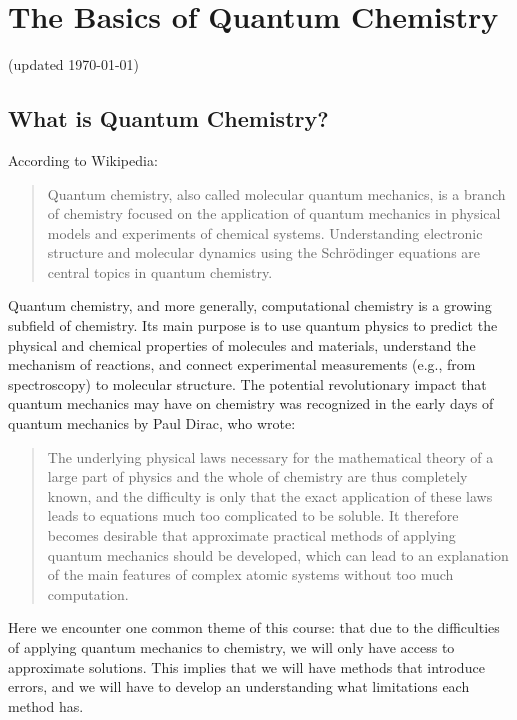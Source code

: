 \documentclass[../Main/chem371-notes.tex]{subfiles}
\begin{document}
\chapter{The Basics of Quantum Chemistry}

(updated \today)

\section{What is Quantum Chemistry?}
According to Wikipedia:
\begin{quotation}
Quantum chemistry, also called molecular quantum mechanics, is a branch of chemistry focused on the application of quantum mechanics in physical models and experiments of chemical systems. Understanding electronic structure and molecular dynamics using the Schrödinger equations are central topics in quantum chemistry.
\end{quotation}

Quantum chemistry, and more generally, computational chemistry is a growing subfield of chemistry.
Its main purpose is to use quantum physics to predict the physical and chemical properties of molecules and materials, understand the mechanism of reactions, and connect experimental measurements (e.g., from spectroscopy) to molecular structure.
The potential revolutionary impact that quantum mechanics may have on chemistry was recognized in the early days of quantum mechanics by Paul Dirac, who wrote:
\begin{quotation}
The underlying physical laws necessary for the mathematical theory of a large part of physics and the whole of chemistry are thus completely known, and the difficulty is only that the exact application of these laws leads to equations much too complicated to be soluble.
It therefore becomes desirable that approximate practical methods of applying quantum mechanics should be developed, which can lead to an explanation of the main features of complex atomic systems without too much computation.
\end{quotation}

Here we encounter one common theme of this course: that due to the difficulties of applying quantum mechanics to chemistry, we will only have access to approximate solutions.
This implies that we will have methods that introduce errors, and we will have to develop an understanding what limitations each method has.
\end{document}
